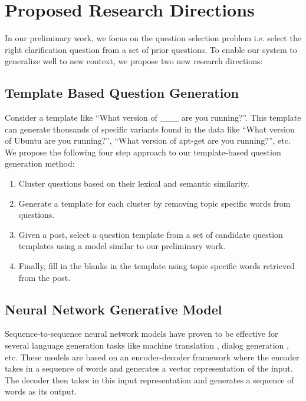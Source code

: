 \documentclass[11pt,a4paper]{article}
\begin{document}
\section{Proposed Research Directions}

In our preliminary work, we focus on the question selection problem i.e. select the right clarification question from a set of prior questions.
To enable our system to generalize well to new context, we propose two new research directions:

\subsection{Template Based Question Generation}

 Consider a template like ``What version of \_\_\_  are you running?''. This template can generate thousands of specific variants found in the data like ``What version of Ubuntu are you running?'',  ``What version of apt-get are you running?'', etc. We propose the following four step approach to our template-based question generation method:

\begin{enumerate} 
\item Cluster questions based on their lexical and semantic similarity. %
\item Generate a template for each cluster by removing topic specific words from questions.
\item Given a post, select a question template from a set of candidate question templates using a model similar to our preliminary work.
\item Finally, fill in the blanks in the template using topic specific words retrieved from the post. 
\end{enumerate}

\subsection{Neural Network Generative Model}
  
Sequence-to-sequence neural network models have proven to be effective for several language generation tasks like machine translation \cite{sutskever2014sequence}, dialog generation \cite{serban2016building}, etc. These models are based on an encoder-decoder framework where the encoder takes in a sequence of words and generates a vector representation of the input. The decoder then takes in this input representation and generates a sequence of words as its output. 
\end{document}
